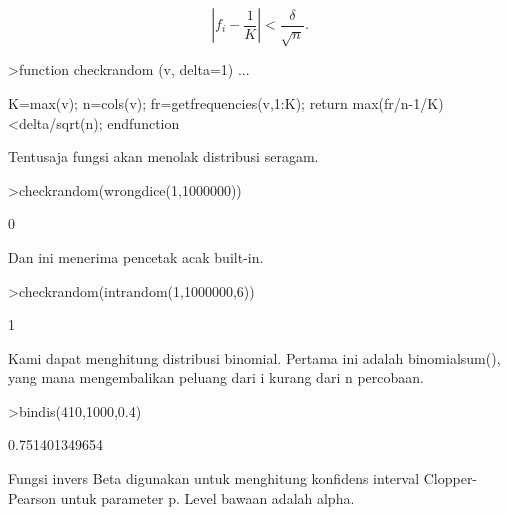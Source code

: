 \documentclass[a4paper,10pt]{article}
\begin{document}
\begin{eulernotebook}
\begin{eulercomment}
\end{eulercomment}
\begin{eulerformula}
\[
\left|f_i-\frac{1}{K}\right| < \frac{\delta}{\sqrt{n}}.
\]
\end{eulerformula}
\begin{eulerprompt}
>function checkrandom (v, delta=1) ...
\end{eulerprompt}
\begin{eulerudf}
    K=max(v); n=cols(v);
    fr=getfrequencies(v,1:K);
    return max(fr/n-1/K)<delta/sqrt(n);
    endfunction
\end{eulerudf}
\begin{eulercomment}
Tentusaja fungsi akan menolak distribusi seragam.
\end{eulercomment}
\begin{eulerprompt}
>checkrandom(wrongdice(1,1000000))
\end{eulerprompt}
\begin{euleroutput}
  0
\end{euleroutput}
\begin{eulercomment}
Dan ini menerima pencetak acak built-in.
\end{eulercomment}
\begin{eulerprompt}
>checkrandom(intrandom(1,1000000,6))
\end{eulerprompt}
\begin{euleroutput}
  1
\end{euleroutput}
\begin{eulercomment}
Kami dapat menghitung distribusi binomial. Pertama ini adalah binomialsum(), yang mana
mengembalikan peluang dari i kurang dari n percobaan.
\end{eulercomment}
\begin{eulerprompt}
>bindis(410,1000,0.4)
\end{eulerprompt}
\begin{euleroutput}
  0.751401349654
\end{euleroutput}
\begin{eulercomment}
Fungsi invers Beta digunakan untuk menghitung konfidens interval Clopper-Pearson untuk
parameter p. Level bawaan adalah alpha.


\end{eulercomment}
\end{eulernotebook}
\end{document}
